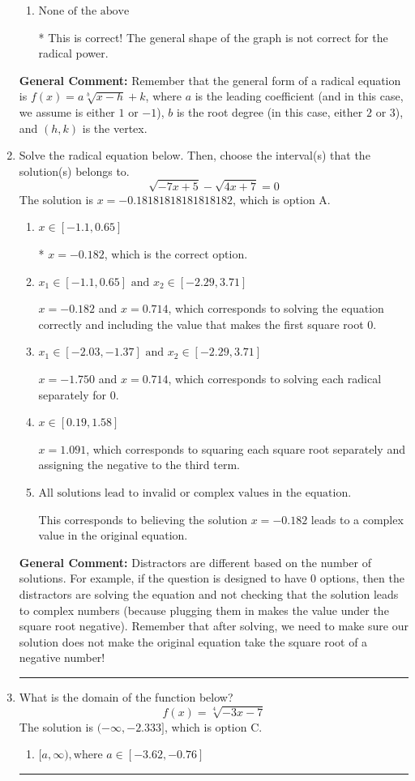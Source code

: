 \documentclass{extbook}[14pt]
\newcommand{\litem}[1]{\item #1

\rule{\textwidth}{0.4pt}}
\begin{document}
\begin{enumerate}
{\begin{enumerate}[label=\Alph*.]
This corresponds to switching the coefficient AND switching the $x$-value of the vertex with the root degree as $2$.
\item \( \text{None of the above} \)

* This is correct! The general shape of the graph is not correct for the radical power.
\end{enumerate}

\textbf{General Comment:} Remember that the general form of a radical equation is $ f(x) = a \sqrt[b]{x - h} + k$, where $a$ is the leading coefficient (and in this case, we assume is either $1$ or $-1$), $b$ is the root degree (in this case, either $2$ or $3$), and $(h, k)$ is the vertex.
}
\litem{
Solve the radical equation below. Then, choose the interval(s) that the solution(s) belongs to.
\[ \sqrt{-7 x + 5} - \sqrt{4 x + 7} = 0 \]
The solution is \( x = -0.18181818181818182 \), which is option A.\begin{enumerate}[label=\Alph*.]
\item \( x \in [-1.1,0.65] \)

* $x = -0.182$, which is the correct option.
\item \( x_1 \in [-1.1, 0.65] \text{ and } x_2 \in [-2.29,3.71] \)

$x = -0.182$ and $x = 0.714$, which corresponds to solving the equation correctly and including the value that makes the first square root 0.
\item \( x_1 \in [-2.03, -1.37] \text{ and } x_2 \in [-2.29,3.71] \)

$x = -1.750$ and $x = 0.714$, which corresponds to solving each radical separately for 0.
\item \( x \in [0.19,1.58] \)

$x = 1.091$, which corresponds to squaring each square root separately and assigning the negative to the third term.
\item \( \text{All solutions lead to invalid or complex values in the equation.} \)

This corresponds to believing the solution $x = -0.182$ leads to a complex value in the original equation.
\end{enumerate}

\textbf{General Comment:} Distractors are different based on the number of solutions. For example, if the question is designed to have 0 options, then the distractors are solving the equation and not checking that the solution leads to complex numbers (because plugging them in makes the value under the square root negative). Remember that after solving, we need to make sure our solution does not make the original equation take the square root of a negative number!
}
\litem{
What is the domain of the function below?
\[ f(x) = \sqrt[4]{-3 x - 7} \]
The solution is \( (-\infty, -2.333] \), which is option C.\begin{enumerate}[label=\Alph*.]
\item \( [a, \infty), \text{where } a \in [-3.62, -0.76] \)


\end{enumerate}}
\end{enumerate}
\end{document}
